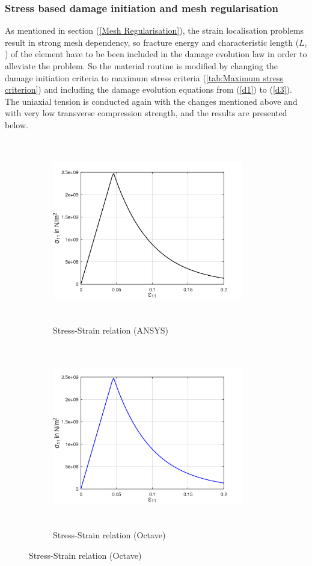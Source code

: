 \documentclass[12pt,twoside]{report}
\begin{document}
\subsubsection{Stress based damage initiation and mesh regularisation}
\indent\indent\indent As mentioned in section (\ref{Mesh Regularisation}), the strain localisation problems result in strong mesh dependency, so fracture energy and characteristic length ($L_{c}$) of the element have to be been included in the damage evolution law in order to alleviate the problem. So the material routine is modified by changing the damage initiation criteria to maximum stress criteria (\ref{tab:Maximum stress criterion}) and including the damage evolution equations from (\ref{d1}) to (\ref{d3}). The uniaxial tension is conducted again with the changes mentioned above and with very low transverse compression strength, and the results are presented below.
\begin{figure}[htbp!]
     \captionsetup[subfigure]{justification=centering}
     \begin{subfigure}{0.4\textwidth}
         \includegraphics[width=8.3cm,height=8cm,keepaspectratio]{22.StressvsStrain_Ansys.png}
         \caption{Stress-Strain relation (ANSYS)}
         \label{fig:Stress-Strain relation in Ansys2}
     \end{subfigure}
     \hspace{1.8cm}
     \begin{subfigure}{0.4\textwidth}
          \includegraphics[width=8.3cm,height=8cm,keepaspectratio]{22.StressvsStrain_Octave.png}
         \caption{Stress-Strain relation (Octave)}
         \label{fig:Stress-Strain relation Octave2}
     \end{subfigure}
\end{figure}
\end{document}
